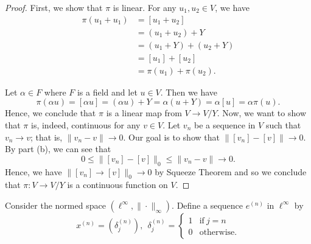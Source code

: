 \documentclass[a4paper]{article}
\begin{document}
\begin{enumerate}
        \begin{proof}
        First, we show that \( \pi  \) is linear. For any \( {u}_{1}, {u}_{2} \in V  \), we have 
        \begin{align*}
            \pi({u}_{1} + {u}_{1}) &= [{u}_{1} + {u}_{2}] \\
                                   &= ({u}_{1} + {u}_{2}) + Y  \\
                                   &= ({u}_{1} + Y) + ({u}_{2} + Y) \\
                                   &= [{u}_{1}] + [{u}_{2}] \\
                                   &= \pi({u}_{1}) + \pi({u}_{2}).
        \end{align*} 
        
        Let \( \alpha \in F  \) where \( F  \) is a field and let \( u \in V  \). Then we have
        \[  \pi( \alpha u ) = [\alpha u] = (\alpha u) + Y = \alpha (u + Y ) = \alpha [u] = \alpha \pi(u). \]
        Hence, we conclude that \( \pi  \) is a linear map from \( V \to V / Y \).
        Now, we want to show that \( \pi  \) is, indeed, continuous for any \( v \in V  \). Let \( {v}_{n}  \) be a sequence in \(  V   \) such that \( {v}_{n} \to v  \); that is, \( \| {v}_{n} - v  \| \to 0  \). Our goal is to show that \( \|[{v}_{n}] - [v] \| \to 0 \). By part (b), we can see that 
        \[  0 \leq \|[{v}_{n}] - [v] \|_{0} \leq \|{v}_{n} - v \| \to 0.  \]
        Hence, we have \( \|[{v}_{n}] \to [v]\|_{0} \to 0  \) by Squeeze Theorem and so we conclude that \( \pi: V \to V / Y  \) is a continuous function on \( V  \).
        \end{proof}
\end{enumerate}

\begin{problem}
    Consider the normed space \( (\ell^{\infty }, \|\cdot\|_{\infty }) \). Define a sequence \( e^{(n)} \) in \( \ell^{\infty } \) by  
    \[  x^{(n)} = ({\delta}_{j}^{(n)}), \ \ {\delta}_{j}^{(n)} = 
    \begin{cases}
        1 &\text{if} \ j = n \\
        0 &\text{otherwise}. 
    \end{cases} \]
\end{problem}
\end{document}
